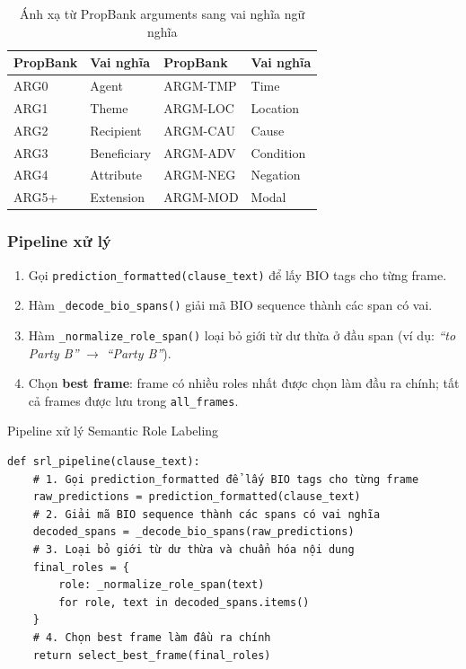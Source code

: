 \begin{table}[H]
    \centering
    \caption{Ánh xạ từ PropBank arguments sang vai nghĩa ngữ nghĩa}
    \label{tab:role_map}
    \begin{tabular}{|l|l||l|l|}
        \hline
        \textbf{PropBank} & \textbf{Vai nghĩa} & \textbf{PropBank} & \textbf{Vai nghĩa} \\ \hline
        ARG0     & Agent     & ARGM-TMP & Time      \\ \hline
        ARG1     & Theme     & ARGM-LOC & Location  \\ \hline
        ARG2     & Recipient & ARGM-CAU & Cause     \\ \hline
        ARG3     & Beneficiary & ARGM-ADV & Condition \\ \hline
        ARG4     & Attribute & ARGM-NEG & Negation  \\ \hline
        ARG5+    & Extension & ARGM-MOD & Modal     \\ \hline
    \end{tabular}
\end{table}

\subsubsection{Pipeline xử lý}

\begin{enumerate}
    \item Gọi \texttt{prediction\_formatted(clause\_text)} để lấy BIO tags cho từng frame.
    \item Hàm \texttt{\_decode\_bio\_spans()} giải mã BIO sequence thành các span có vai.
    \item Hàm \texttt{\_normalize\_role\_span()} loại bỏ giới từ dư thừa ở đầu span (ví dụ: \textit{``to Party B''} $\rightarrow$ \textit{``Party B''}).
    \item Chọn \textbf{best frame}: frame có nhiều roles nhất được chọn làm đầu ra chính; tất cả frames được lưu trong \texttt{all\_frames}.
\end{enumerate}

\begin{mintbox}{Pipeline xử lý Semantic Role Labeling}
\begin{verbatim}
def srl_pipeline(clause_text):
    # 1. Gọi prediction_formatted để lấy BIO tags cho từng frame
    raw_predictions = prediction_formatted(clause_text)
    # 2. Giải mã BIO sequence thành các spans có vai nghĩa
    decoded_spans = _decode_bio_spans(raw_predictions)
    # 3. Loại bỏ giới từ dư thừa và chuẩn hóa nội dung
    final_roles = {
        role: _normalize_role_span(text) 
        for role, text in decoded_spans.items()
    }
    # 4. Chọn best frame làm đầu ra chính
    return select_best_frame(final_roles)
\end{verbatim}
\end{mintbox}

